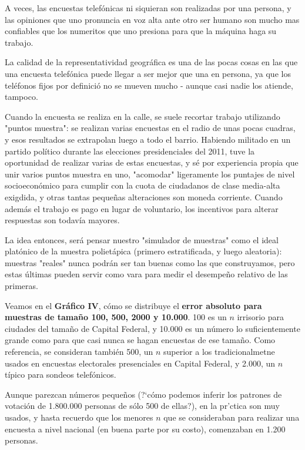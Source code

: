 \documentclass[12pt, a4paper]{article}
\begin{document}
A veces, las encuestas telef\'onicas ni siquieran son realizadas por una persona, y las opiniones que uno pronuncia en voz alta ante otro ser humano son mucho mas confiables que los numeritos que uno presiona para que la m\'aquina haga su trabajo.

La calidad de la representatividad geogr\'afica es una de las pocas cosas en las que una encuesta telef\'onica puede llegar a ser mejor que una en persona, ya que los tel\'efonos fijos por definici\'o no se mueven mucho - aunque casi nadie los atiende, tampoco.

Cuando la encuesta se realiza en la calle, se suele recortar trabajo utilizando "puntos muestra": se realizan varias encuestas en el radio de unas pocas cuadras, y esos resultados se extrapolan luego a todo el barrio. Habiendo militado en un partido pol\'itico durante las elecciones presidenciales del 2011, tuve la oportunidad de realizar varias de estas encuestas, y s\'e por experiencia propia que unir varios puntos muestra en uno, "acomodar" ligeramente los puntajes de nivel socioecon\'omico para cumplir con la cuota de ciudadanos de clase media-alta exigdida, y otras tantas peque\~nas alteraciones son moneda corriente. Cuando adem\'as el trabajo es pago en lugar de voluntario, los incentivos para alterar respuestas son todav\'ia mayores.

La idea entonces, ser\'a pensar nuestro "simulador de muestras" como el ideal plat\'onico de la muestra poliet\'apica (primero estratificada, y luego aleatoria): muestras "reales" nunca podr\'an ser tan buenas como las que construyamos, pero estas \'ultimas pueden servir como vara para medir el desempe\~no relativo de las primeras.

Veamos en el \textbf{Gr\'afico IV}, c\'omo se distribuye el \textbf{error absoluto para muestras de tama\~no 100, 500, 2000 y 10.000}. 100 es un $n$ irrisorio para ciudades del tama\~no de Capital Federal, y 10.000 es un n\'umero lo suficientemente grande como para que casi nunca se hagan encuestas de ese tama\~no. Como referencia, se consideran tambi\'en 500, un $n$ superior a los tradicionalmetne usados en encuestas electorales presenciales en Capital Federal, y 2.000, un $n$ t\'ipico para sondeos telef\'onicos. 

Aunque parezcan n\'umeros peque\~nos (?`c\'omo podemos inferir los patrones de votaci\'on de 1.800.000 personas de s\'olo 500 de ellas?), en la pr\a'ctica son muy usados, y hasta recuerdo que los menores $n$ que se consideraban para realizar una encuesta a nivel nacional (en buena parte por su costo), comenzaban en 1.200 personas.
\end{document}
